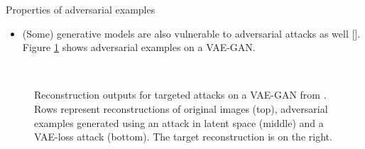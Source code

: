 \documentclass{beamer}
\newcommand{\citet}[1]{{\color{citecolor}\relscale{0.8}\textcite{#1}}}
\newcommand{\citep}[1]{{\color{citecolor}\relscale{0.8}[\textcite{#1}]}}
\begin{document}
\begin{frame}[allowframebreaks=0.9]{Properties of adversarial examples}
\begin{itemize}
    \item (Some) generative models are also vulnerable to adversarial attacks as well \citep{Kos:2018:AEGM, Goodfellow:2014:EHAE}. Figure \ref{fig:vae-gan-targetad-face} shows adversarial examples on a VAE-GAN.
\end{itemize}
\begin{figure}[htbp!]
	\begin{center}
		~
	\end{center}
	\caption{Reconstruction outputs for targeted attacks on a VAE-GAN from \citet{Kos:2018:AEGM}. Rows represent reconstructions of original images (top), adversarial examples generated using an attack in latent space (middle) and a VAE-loss attack (bottom). The target reconstruction is on the right.}
	\label{fig:vae-gan-targetad-face}
\end{figure}
\end{frame}
\end{document}
